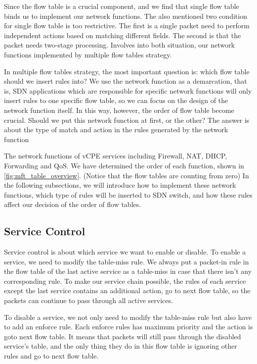\documentclass[journal]{IEEEtran}
\begin{document}
Since the flow table is a crucial component, and we find that single flow table binds us to implement our network functions. The\cite{onf-multi-tables} also mentioned two condition for single flow table is too restrictive. The first is a single packet need to perform independent actions based on matching different fields. The second is that the packet needs two-stage processing. Involves into both situation, our network functions implemented by multiple flow tables strategy.

In multiple flow tables strategy, the most important question is: which flow table should we insert rules into? We use the network function as a demarcation, that is, SDN applications which are responsible for specific network functions will only insert rules to one specific flow table, so we can focus on the design of the network function itself. In this way, however, the order of flow table become crucial. Should we put this network function at first, or the other? The answer is about the type of match and action in the rules generated by the network function

The network functions of vCPE services including Firewall, NAT, DHCP, Forwarding and QoS. We have determined the order of each function, shown in \ref{fig:mft_table_overview}. (Notice that the flow tables are counting from zero) In the following subsections, we will introduce how to implement these network functions, which type of rules will be inserted to SDN switch, and how these rules affect our decision of the order of flow tables.



\subsection{Service Control}
Service control is about which service we want to enable or disable. To enable a service, we need to modify the table-miss rule. We always put a packet-in rule in the flow table of the last active service as a table-miss in case that there isn't any corresponding rule. To make our service chain possible, the rules of each service except the last service contains an additional action, go to next flow table, so the packets can continue to pass through all active services.

To disable a service, we not only need to modify the table-miss rule but also have to add an enforce rule. Each enforce rules has maximum priority and the action is goto next flow table. It means that packets will still pass through the disabled service's table, and the only thing they do in this flow table is ignoring other rules and go to next flow table.
\end{document}
